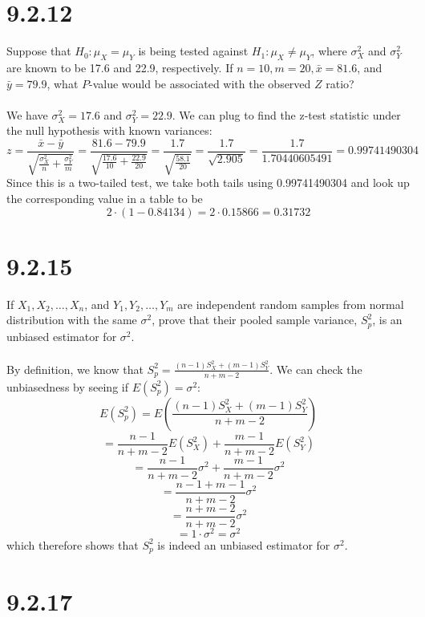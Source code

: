 \documentclass{article}
\begin{document}
\thispagestyle{firstpageheader}
{\Large 

\section*{9.2.12}

Suppose that \(H_0: \mu_X = \mu_Y\) is being tested against \(H_1: \mu_X \neq \mu_Y\), where \(\sigma^2_X\) and \(\sigma^2_Y\) are known to be 17.6 and 22.9, respectively. If \(n = 10, m = 20, \bar{x} = 81.6\), and \(\bar{y} = 79.9\), what \(P\)-value would be associated with the observed \(Z\) ratio?
\\
\\
We have \(\sigma^2_X = 17.6\) and \(\sigma^2_Y = 22.9\). We can plug to find the z-test statistic under the null hypothesis with known variances: 
\[
z = \frac{\bar{x} - \bar{y}}{\sqrt{\frac{\sigma^2_X}{n} + \frac{\sigma^2_Y}{m}}} = \frac{81.6 - 79.9}{\sqrt{\frac{17.6}{10} + \frac{22.9}{20}}} = \frac{1.7}{\sqrt{\frac{58.1}{20}}} = \frac{1.7}{\sqrt{2.905}} = \frac{1.7}{1.70440605491} = 0.99741490304
\]
Since this is a two-tailed test, we take both tails using 0.99741490304 and look up the corresponding value in a table to be 
\[
2 \cdot (1 - 0.84134) = 2 \cdot 0.15866 = 0.31732
\]

\section*{9.2.15}

If \(X_1, X_2, \dots, X_n\), and \(Y_1, Y_2, \dots, Y_m\) are independent random samples from normal distribution with the same \(\sigma^2\), prove that their pooled sample variance, \(S^2_p\), is an unbiased estimator for \(\sigma^2\).
\\
\\
By definition, we know that \(S^2_p = \frac{(n-1)S^2_X + (m-1)S^2_Y}{n + m - 2}\). We can check the unbiasedness by seeing if \(E(S^2_p) = \sigma^2\):
\[
E(S^2_p) = E(\frac{(n-1)S^2_X + (m-1)S^2_Y}{n + m - 2})
\]
\[
= \frac{n-1}{n + m - 2} E(S^2_X) + \frac{m-1}{n + m - 2} E(S^2_Y) 
\]
\[
= \frac{n-1}{n + m - 2} \sigma^2 + \frac{m-1}{n + m - 2} \sigma^2 
\]
\[
= \frac{n - 1 + m - 1}{n + m - 2} \sigma^2
\]
\[
= \frac{n + m - 2}{n + m - 2} \sigma^2
\]
\[
= 1 \cdot \sigma^2 = \sigma^2
\]
which therefore shows that \(S^2_p\) is indeed an unbiased estimator for \(\sigma^2\).

\section*{9.2.17}

}
\end{document}
